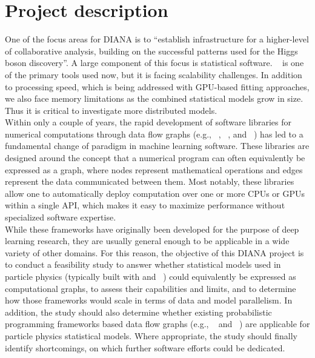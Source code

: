 \section{Project description}

One of the focus areas for DIANA is to ``establish infrastructure for a higher-level of collaborative analysis, building on the successful patterns used for the Higgs boson discovery''.
A large component of this focus is statistical software.
~\cite{Verkerke:2003ir} is one of the primary tools used now, but it is facing scalability challenges.
In addition to processing speed, which is being addressed with GPU-based fitting approaches, we also face memory limitations as the combined statistical models grow in size.
Thus it is critical to investigate more distributed models.\\

Within only a couple of years, the rapid development of software libraries for numerical computations through data flow graphs (e.g., ~\cite{tensorflow2015-whitepaper}, ~\cite{theano-full}, and ~\cite{DBLP:journals/corr/ChenLLLWWXXZZ15}) has led to a fundamental change of paradigm in machine learning software.
These libraries are designed around the concept that a numerical program can often equivalently be expressed as a graph, where nodes represent mathematical operations and edges represent the data communicated between them.
Most notably, these libraries allow one to automatically deploy computation over one or more CPUs or GPUs within a single API, which makes it easy to maximize performance without specialized software expertise.\\

While these frameworks have originally been developed for the purpose of deep learning research, they are usually general enough to be applicable in a wide variety of other domains.
For this reason, the objective of this DIANA project is to conduct a feasibility study to answer whether statistical models used in particle physics (typically built with  and ~\cite{Cranmer:2012sba}) could equivalently be expressed as computational graphs, to assess their capabilities and limits, and to determine how those frameworks would scale in terms of data and model parallelism.
In addition, the study should also determine whether existing probabilistic programming frameworks based data flow graphs (e.g., ~\cite{tran2016edward} and ~\cite{tensorprob2016}) are applicable for particle physics statistical models.
Where appropriate, the study should finally identify shortcomings, on which further software efforts could be dedicated.\\

